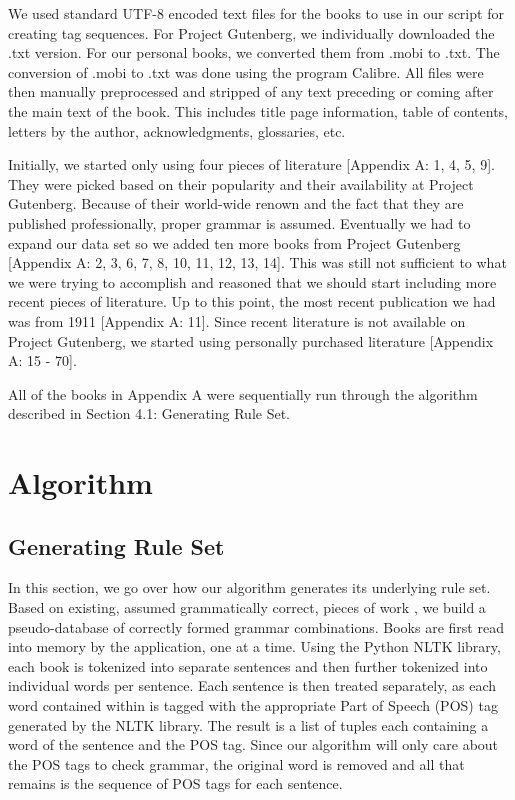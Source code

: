 \documentclass[11pt,a4paper]{article}
\begin{document}
\begin{multicols}{2}
We used standard UTF-8 encoded text files for the books to use in our script for creating tag sequences. For Project Gutenberg, we individually downloaded the .txt version.  For our personal books, we converted them from .mobi to .txt. The conversion of .mobi to .txt was done using the program Calibre. All files were then manually preprocessed and stripped of any text preceding or coming after the main text of the book. This includes title page information, table of contents, letters by the author, acknowledgments, glossaries, etc.

Initially, we started only using four pieces of literature [Appendix A: 1, 4, 5, 9]. They were picked based on their popularity and their availability at Project Gutenberg. Because of their world-wide renown and the fact that they are published professionally,  proper grammar is assumed. Eventually we had to expand our data set so we added ten more books from Project Gutenberg [Appendix A: 2, 3, 6, 7, 8, 10, 11, 12, 13, 14]. This was still not sufficient to what we were trying to accomplish and reasoned that we should start including more recent pieces of literature. Up to this point, the most recent publication we had was from 1911 [Appendix A: 11]. Since recent literature is not available on Project Gutenberg, we started using personally purchased literature [Appendix A: 15 - 70].

All of the books in Appendix A were sequentially run through the algorithm described in Section 4.1: Generating Rule Set. 


\section{Algorithm}


\subsection{Generating Rule Set}

In this section, we go over how our algorithm generates its underlying rule set. Based on existing, assumed grammatically correct, pieces of work \cite{gutenberg}, we build a pseudo-database of correctly formed grammar combinations. Books are first read into memory by the application, one at a time. Using the Python NLTK library, each book is tokenized into separate sentences and then further tokenized into individual words per sentence. Each sentence is then treated separately, as each word contained within is tagged with the appropriate Part of Speech (POS) tag generated by the NLTK library. The result is a list of tuples each containing a word of the sentence and the POS tag. Since our algorithm will only care about the POS tags to check grammar, the original word is removed and all that remains is the sequence of POS tags for each sentence. 


\end{multicols}
\end{document}
